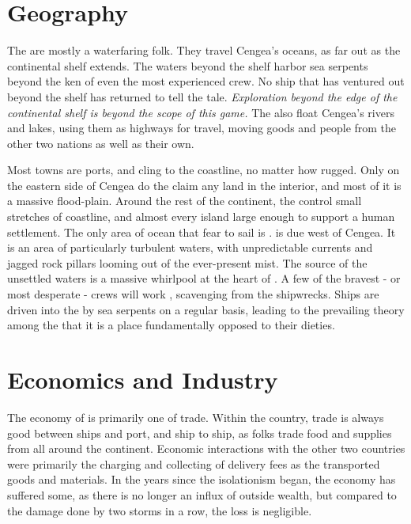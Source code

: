 \documentclass[blue]{GL2020}
\begin{document}
\section*{Geography}
The \pShip{} are mostly a waterfaring folk. They travel Cengea's oceans, as far out as the continental shelf extends. The waters beyond the shelf harbor sea serpents beyond the ken of even the most experienced \pShippies{} crew. No ship that has ventured out beyond the shelf has returned to tell the tale. \emph{Exploration beyond the edge of the continental shelf is beyond the scope of this game.} The \pShippies{} also float Cengea's rivers and lakes, using them as highways for travel, moving goods and people from the other two nations as well as their own.

Most \pShip{} towns are ports, and cling to the coastline, no matter how rugged. Only on the eastern side of Cengea do the \pShippies{} claim any land in the interior, and most of it is a massive flood-plain. Around the rest of the continent, the \pShip{} control small stretches of coastline, and almost every island large enough to support a human settlement. The only area of ocean that \pShippies{} fear to sail is \pWod{}. \pWod{} is due west of Cengea. It is an area of particularly turbulent waters, with unpredictable currents and jagged rock pillars looming out of the ever-present mist. The source of the unsettled waters is a massive whirlpool at the heart of \pWod{}. A few of the bravest - or most desperate - crews will work \pWod{}, scavenging from the shipwrecks. Ships are driven into the \pWod{} by sea serpents on a regular basis, leading to the prevailing theory among the \pShippies{} that it is a place fundamentally opposed to their dieties.  %

\section*{Economics and Industry}
The economy of \pShip{} is primarily one of trade. Within the country, trade is always good between ships and port, and ship to ship, as folks trade food and supplies from all around the continent. Economic interactions with the other two countries were primarily the charging and collecting of delivery fees as the \pShippies{} transported goods and materials. In the years since the isolationism began, the economy has suffered some, as there is no longer an influx of outside wealth, but compared to the damage done by two storms in a row, the loss is negligible.
\end{document}
